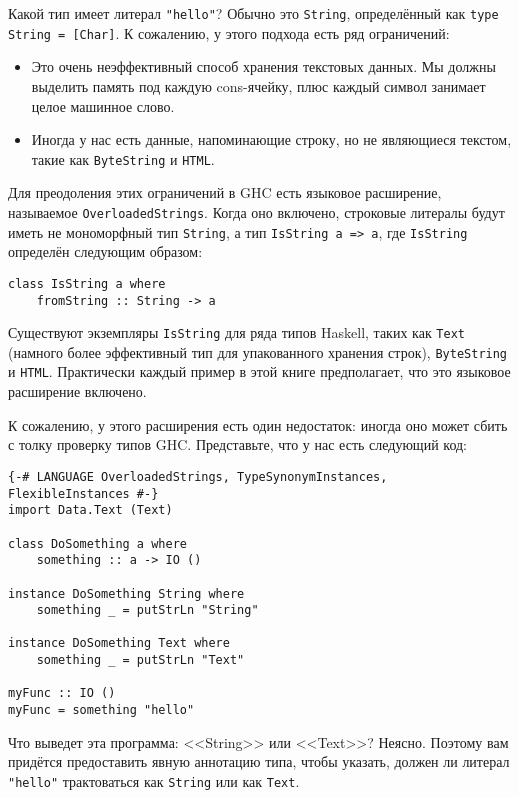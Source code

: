 Какой тип имеет литерал \lstinline'"hello"'? Обычно это \lstinline'String', определённый как \lstinline'type String = [Char]'. К сожалению, у этого подхода есть ряд ограничений:
\begin{itemize}
\item Это очень неэффективный способ хранения текстовых данных. Мы должны выделить память под каждую cons-ячейку, плюс каждый символ занимает целое машинное слово.
\item Иногда у нас есть данные, напоминающие строку, но не являющиеся текстом, такие как \lstinline'ByteString' и \lstinline'HTML'.
\end{itemize}

Для преодоления этих ограничений в GHC есть языковое расширение, называемое \lstinline'OverloadedStrings'. Когда оно включено, строковые литералы будут иметь не мономорфный тип \lstinline'String', а тип \lstinline'IsString a => a', где \lstinline'IsString' определён следующим образом:

\begin{lstlisting}
class IsString a where
    fromString :: String -> a
\end{lstlisting}

Существуют экземпляры \lstinline'IsString' для ряда типов Haskell, таких как \lstinline'Text' (намного более эффективный тип для упакованного хранения строк), \lstinline'ByteString' и \lstinline'HTML'. Практически каждый пример в этой книге предполагает, что это языковое расширение включено.

К сожалению, у этого расширения есть один недостаток: иногда оно может сбить с толку проверку типов GHC. Представьте, что у нас есть следующий код:

\begin{lstlisting}
{-# LANGUAGE OverloadedStrings, TypeSynonymInstances, FlexibleInstances #-}
import Data.Text (Text)

class DoSomething a where
    something :: a -> IO ()

instance DoSomething String where
    something _ = putStrLn "String"

instance DoSomething Text where
    something _ = putStrLn "Text"

myFunc :: IO ()
myFunc = something "hello"
\end{lstlisting}

Что выведет эта программа: <<String>> или <<Text>>? Неясно. Поэтому вам придётся предоставить явную аннотацию типа, чтобы указать, должен ли литерал \lstinline'"hello"' трактоваться как \lstinline'String' или как \lstinline'Text'.

